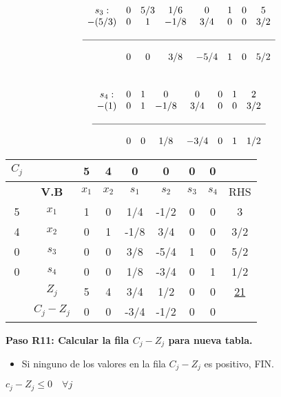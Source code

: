 \documentclass{templateNote}
\begin{document}
\begin{equation*}
    \begin{array}{cccccccc}
        s_3: & 0 & 5/3 & 1/6 & 0 & 1 & 0 & 5 \\
        -(5/3) & 0 & 1 & -1/8 & 3/4 & 0 & 0 & 3/2 \\
        \\ \hline \\
        & 0 & 0 & 3/8 & -5/4 & 1 & 0 & 5/2
    \end{array}
\end{equation*}
\\
\begin{equation*}
    \begin{array}{cccccccc}
        s_4: & 0 & 1 & 0 & 0 & 0 & 1 & 2 \\
        -(1) & 0 & 1 & -1/8 & 3/4 & 0 & 0 & 3/2 \\
        \\ \hline \\
        & 0 & 0 & 1/8 & -3/4 & 0 & 1 & 1/2
    \end{array}
\end{equation*}
\begin{center}
    \begin{tabular}{|c|c|c|c|c|c|c|c|c|}
        \hline
        $C_j$ & & 5 & 4 & 0 & 0 & 0 & 0 & \\ \hline
        & \textbf{V.B} & $x_1$ & $x_2$ & $s_1$ & $s_2$ & $s_3$ & $s_4$ & RHS \\ \hline
        5 & $x_1$ & 1 & 0 & 1/4 & -1/2 & 0 & 0 & 3 \\ \hline
        4 & $x_2$ & 0 & 1 & -1/8 & 3/4 & 0 & 0 & 3/2 \\ \hline
        0 & $s_3$ & 0 & 0 & 3/8 & -5/4 & 1 & 0 & 5/2 \\ \hline
        0 & $s_4$ & 0 & 0 & 1/8 & -3/4 & 0 & 1 & 1/2 \\ \hline
        & $Z_j$ & 5 & 4 & 3/4 & 1/2 & 0 & 0 & \underline{21} \\ \hline
        & $C_j - Z_j$ & 0 & 0 & -3/4 & -1/2 & 0 & 0 & \\ \hline
    \end{tabular}
\end{center}
\textbf{Paso R11: Calcular la fila $C_j - Z_j$ para nueva tabla.}
\begin{itemize}
    \item Si ninguno de los valores en la fila $C_j - Z_j$ es positivo,  FIN.
\end{itemize}
\begin{center}
    $c_j - Z_j \leq 0 \quad \forall j$
\end{center}
\end{document}
